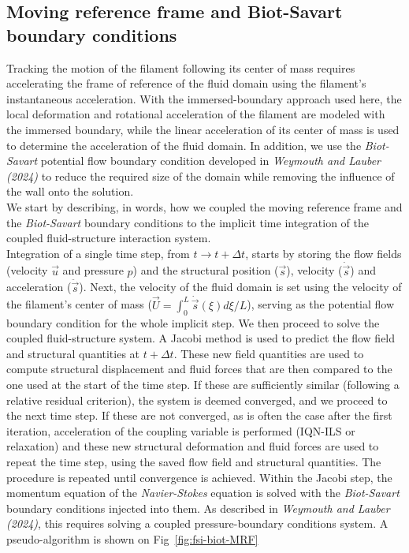 \documentclass{jfm}
\begin{document}
\subsection{Moving reference frame and Biot-Savart boundary conditions}\label{sec:far-field}
Tracking the motion of the filament following its center of mass requires accelerating the frame of reference of the fluid domain using the filament's instantaneous acceleration. With the immersed-boundary approach used here, the local deformation and rotational acceleration of the filament are modeled with the immersed boundary, while the linear acceleration of its center of mass is used to determine the acceleration of the fluid domain. In addition, we use the \emph{Biot-Savart} potential flow boundary condition developed in \emph{Weymouth and Lauber (2024)} to reduce the required size of the domain while removing the influence of the wall onto the solution.\\
We start by describing, in words, how we coupled the moving reference frame and the \emph{Biot-Savart} boundary conditions to the implicit time integration of the coupled fluid-structure interaction system.\\
Integration of a single time step, from $t\to t+\Delta t$, starts by storing the flow fields (velocity $\vec u$ and pressure $p$) and the structural position ($\vec{s}$), velocity ($\dot{\vec{s}}$) and acceleration ($\ddot{\vec{s}}$). Next, the velocity of the fluid domain is set using the velocity of the filament's center of mass ($\vec{U}=\int_{0}^{L}\dot{\vec s}(\xi)d\xi/L$), serving as the potential flow boundary condition for the whole implicit step. We then proceed to solve the coupled fluid-structure system. A Jacobi method is used to predict the flow field and structural quantities at $t+\Delta t$. These new field quantities are used to compute structural displacement and fluid forces that are then compared to the one used at the start of the time step. If these are sufficiently similar (following a relative residual criterion), the system is deemed converged, and we proceed to the next time step. If these are not converged, as is often the case after the first iteration, acceleration of the coupling variable is performed (IQN-ILS or relaxation) and these new structural deformation and fluid forces are used to repeat the time step, using the saved flow field and structural quantities. The procedure is repeated until convergence is achieved. Within the Jacobi step, the momentum equation of the \emph{Navier-Stokes} equation is solved with the \emph{Biot-Savart} boundary conditions injected into them. As described in \emph{Weymouth and Lauber (2024)}, this requires solving a coupled pressure-boundary conditions system. A pseudo-algorithm is shown on Fig~\ref{fig:fsi-biot-MRF}
\end{document}
